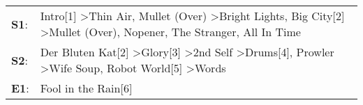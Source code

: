 \begin{supertabular}{p{0.03\textwidth}p{0.92\textwidth}}
 \textbf{S1}:  &    Intro[1]\textsuperscript{} \textgreater \enspace Thin Air\textsuperscript{}, \enspace Mullet (Over)\textsuperscript{} \textgreater \enspace Bright Lights, Big City[2]\textsuperscript{} \textgreater \enspace Mullet (Over)\textsuperscript{}, \enspace Nopener\textsuperscript{}, \enspace The Stranger\textsuperscript{}, \enspace All In Time\textsuperscript{}  \enspace  \\
 \textbf{S2}:  &  Der Bluten Kat[2]\textsuperscript{} \textgreater \enspace Glory[3]\textsuperscript{} \textgreater \enspace 2nd Self\textsuperscript{} \textgreater \enspace Drums[4]\textsuperscript{}, \enspace Prowler\textsuperscript{} \textgreater \enspace Wife Soup\textsuperscript{}, \enspace Robot World[5]\textsuperscript{} \textgreater \enspace Words\textsuperscript{}  \enspace  \\
 \textbf{E1}:  &                                                                                                                                                                                                                                                                                                                                  Fool in the Rain[6]\textsuperscript{}  \enspace  \\
\end{supertabular}
